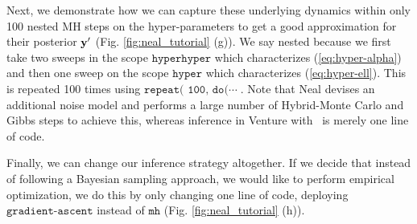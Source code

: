Next, we demonstrate how we can capture these underlying dynamics within only
100  nested \ac{MH} steps on the hyper-parameters to get a good approximation
for their posterior $\mathbf{y}^\prime$ (Fig. \ref{fig:neal_tutorial} (g)).
We say nested because we first take two sweeps in the scope
$\texttt{hyperhyper}$ which characterizes (\ref{eq:hyper-alpha}) and then one
sweep on the scope $\texttt{hyper}$ which characterizes (\ref{eq:hyper-ell}).
This is repeated 100 times using $\texttt{repeat( 100, do(}\cdots\;$.
Note that Neal devises an additional noise model and performs a large number of Hybrid-Monte Carlo and Gibbs steps to achieve this, whereas inference in Venture with \gpmem\ is merely one line of code. 

Finally, we can change our inference strategy altogether. If we decide that instead of
following a Bayesian sampling approach, we would like to perform empirical optimization,
we do this by only changing one line of code, deploying $\texttt{gradient-ascent}$ instead
of $\texttt{mh}$ (Fig. \ref{fig:neal_tutorial} (h)). 

